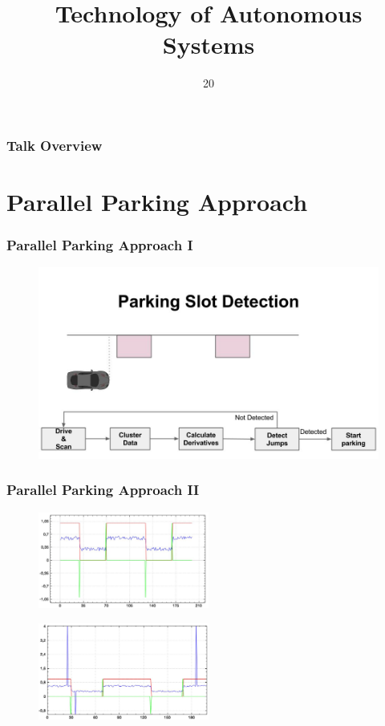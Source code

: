 \documentclass[noshadow]{LSRslides}
\title{Technology of Autonomous Systems}
\date{20}{01}{2015}
\begin{document}
\begin{frame}
    \titlepage
\end{frame}

\begin{frame}
	\frametitle{Talk Overview}
\tableofcontents
\end{frame}

\section{Parallel Parking Approach}
\begin{frame}
\frametitle{Parallel Parking Approach I}
\begin{figure}
\includegraphics[width = 1\textwidth]{Parking_Detection_TAS.jpg}
\end{figure}
\end{frame}

\begin{frame}
\frametitle{Parallel Parking Approach II}
\begin{figure}
\includegraphics[width = 0.5\textwidth]{Parking_Detection_TAS_21.jpg}
\end{figure}

\begin{figure}
\includegraphics[width = 0.5\textwidth]{Parking_Detection_TAS_22.jpg}
\end{figure}

\end{frame}
\end{document}
